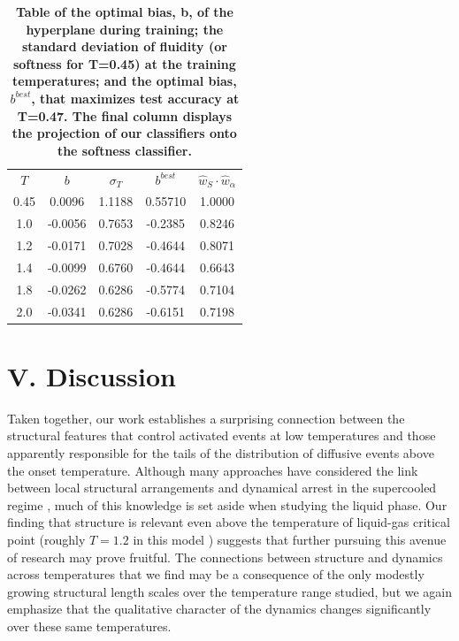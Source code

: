 \documentclass[aps,reprint,superscriptaddress,nofootinbib, notitlepage,prl]{revtex4-2}
\begin{document}
\begin{table}
    \centering
    \begin{tabular}{c|c|c|c|c}
         \hline\hline
         $T$ & $b$ & $\sigma_T$ & $b^{best}$ & $\hat{w}_{S} \cdot \hat{w}_{\alpha}$\\
     0.45  & 0.0096  & 1.1188 & 0.55710 & 1.0000\\
     1.0  & -0.0056  & 0.7653 & -0.2385 & 0.8246\\
     1.2  & -0.0171  & 0.7028 & -0.4644 & 0.8071\\
     1.4  & -0.0099  & 0.6760 & -0.4644 & 0.6643\\
     1.8  & -0.0262  & 0.6286 & -0.5774 & 0.7104\\
     2.0  & -0.0341  & 0.6286 & -0.6151 & 0.7198\\
    \end{tabular}
    \caption{\textbf{Table of the optimal bias, b, of the hyperplane during training; the standard deviation of fluidity (or softness for T=0.45) at the training temperatures; and the optimal bias, $b^{best}$, that maximizes test accuracy at T=0.47. The final column displays the projection of our classifiers onto the softness classifier.}}
    \label{tab:trainingTemperaturebandsigma_phop}
\end{table} 

%
%
\section*{V. Discussion}
%
%

Taken together, our work establishes a surprising connection between the structural features that control activated events at low temperatures and those apparently responsible for the tails of the distribution of diffusive events above the onset temperature. Although many approaches have considered the link between local structural arrangements and dynamical arrest in the supercooled regime \cite{royall2015role}, much of this knowledge is set aside when studying the liquid phase. Our finding that structure is relevant even above the temperature of liquid-gas critical point (roughly $T=1.2$ in this model \cite{testard2014intermittent}) suggests that further pursuing this avenue of research may prove fruitful. The connections between structure and dynamics across temperatures that we find may be a consequence of the only modestly growing structural length scales over the temperature range studied, but we again emphasize that the qualitative character of the dynamics changes significantly over these same temperatures.  
\end{document}
